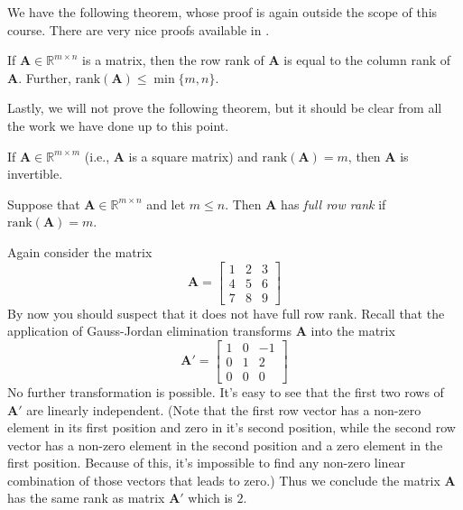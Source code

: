 We have the following theorem, whose proof is again outside the scope of this course. There are very nice proofs available in \cite{Str87}. 

\begin{theorem} If $\mathbf{A} \in \mathbb{R}^{m \times n}$ is a matrix, then the row rank of $\mathbf{A}$ is equal to the column rank of $\mathbf{A}$. Further, $\mathrm{rank}(\mathbf{A}) \leq \min\{m,n\}$. 
\end{theorem}

Lastly, we will not prove the following theorem, but it should be clear from all the work we have done up to this point.
\begin{theorem} If $\mathbf{A} \in \mathbb{R}^{m \times m}$ (i.e., $\mathbf{A}$ is a square matrix) and $\mathrm{rank}(\mathbf{A}) = m$, then $\mathbf{A}$ is invertible.
\end{theorem}

\begin{definition} Suppose that $\mathbf{A} \in \mathbb{R}^{m \times n}$ and let $m \leq n$. Then $\mathbf{A}$ has \textit{full row rank} if $\mathrm{rank}(\mathbf{A}) = m$. 
\end{definition}

\begin{example} Again consider the matrix
\begin{displaymath}
\mathbf{A} = \begin{bmatrix}
1 & 2 & 3\\
4 & 5 & 6\\
7 & 8 & 9
\end{bmatrix}
\end{displaymath}
By now you should suspect that it does not have full row rank. Recall that the application of Gauss-Jordan elimination transforms $\mathbf{A}$ into the matrix
\begin{displaymath}
\mathbf{A}' = \left[
\begin{array}{ccc}
1 & 0 & -1\\
0 & 1 &  2\\
0 & 0 & 0
\end{array}
\right]
\end{displaymath}
No further transformation is possible. It's easy to see that the first two rows of $\mathbf{A}'$ are linearly independent. (Note that the first row vector has a non-zero element in its first position and zero in it's second position, while the second row vector has a non-zero element in the second position and a zero element in the first position. Because of this, it's impossible to find any non-zero linear combination of those vectors that leads to zero.) Thus we conclude the matrix $\mathbf{A}$ has the same rank as matrix $\mathbf{A}'$ which is $2$. 
\end{example}


